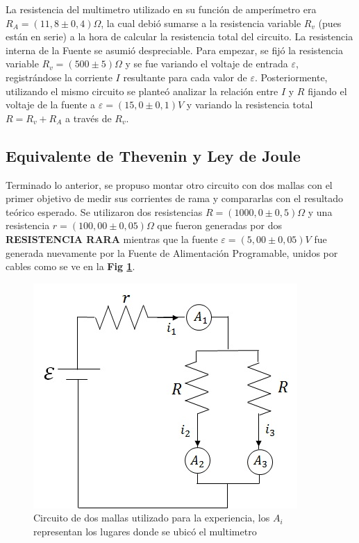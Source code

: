 \documentclass[11pt,a4paper]{article}
\begin{document}
La resistencia del multimetro utilizado en su función de amperímetro era $R_{A} = (11,8 \pm 0,4) \Omega$, la cual debió sumarse a la resistencia variable $R_v$ (pues están en serie) a la hora de calcular la resistencia total del circuito. La resistencia interna de la Fuente se asumió despreciable. Para empezar, se fijó la resistencia variable $R_v = (500 \pm 5)\Omega$ y se fue variando el voltaje de entrada $\varepsilon$, registrándose la corriente $I$ resultante para cada valor de $\varepsilon$. Posteriormente, utilizando el mismo circuito se planteó analizar la relación entre $I$ y $R$ fijando el voltaje de la fuente a $\varepsilon = (15,0 \pm 0,1)V$ y variando la resistencia total $R = R_v + R_A$ a través de $R_v$. 


\subsection{Equivalente de Thevenin y Ley de Joule}

Terminado lo anterior, se propuso montar otro circuito con dos mallas con el primer objetivo de medir sus corrientes de rama y compararlas con el resultado teórico esperado. Se utilizaron dos resistencias $R = (1000,0\pm0,5)\Omega$ y una resistencia $r = (100,00\pm0,05)\Omega$ que fueron generadas por dos \textbf{RESISTENCIA RARA} mientras que la fuente $\varepsilon = (5,00\pm0,05)V$ fue generada nuevamente por la Fuente de Alimentación Programable, unidos por cables como se ve en la \textbf{Fig \ref{fig:circ_mallas}}.

\begin{figure}[h]
  \centering
  \includegraphics[scale=1]{Mallas_sin_carga}
  \caption{Circuito de dos mallas utilizado para la experiencia, los $A_i$ representan los lugares donde se ubicó el multimetro}
  \label{fig:circ_mallas}
\end{figure}
\end{document}
